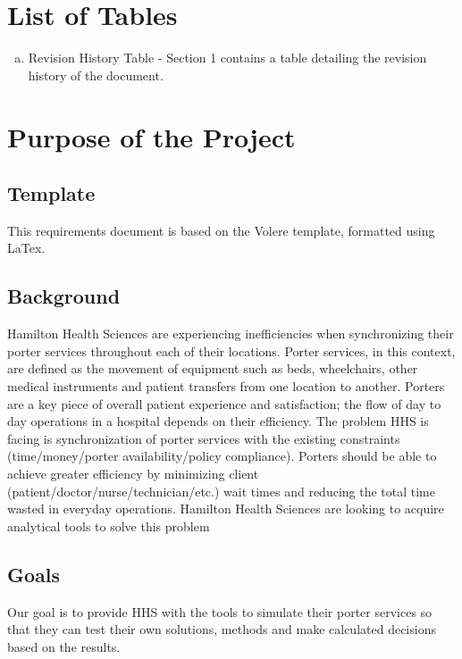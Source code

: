 \documentclass[paper=letter, fontsize=10pt]{scrartcl}
\numberwithin{equation}{section}		%
\numberwithin{figure}{section}			%
\numberwithin{table}{section}				%
\begin{document}
\section{List of Tables}
\begin{enumerate}[(a)]
	\item Revision History Table - Section 1 contains a table detailing the revision history of the document.
\end{enumerate}

\section{Purpose of the Project}
\subsection{Template}
This requirements document is based on the Volere template, formatted using LaTex.
\subsection{Background}
Hamilton Health Sciences are experiencing inefficiencies when synchronizing their porter services throughout each of their locations. Porter services, in this context, are defined as the movement of equipment such as beds, wheelchairs, other medical instruments and patient transfers from one location to another. Porters are a key piece of overall patient experience and satisfaction; the flow of day to day operations in a hospital depends on their efficiency. The problem HHS is facing is synchronization of porter services with the existing constraints (time/money/porter availability/policy compliance).  Porters should be able to achieve greater efficiency by minimizing client (patient/doctor/nurse/technician/etc.) wait times and reducing the total time wasted in everyday operations. Hamilton Health Sciences are looking to acquire analytical tools to solve this problem
\subsection{Goals}
Our goal is to provide HHS with the tools to simulate their porter services so that they can test their own solutions, methods and make calculated decisions based on the results.
\end{document}
